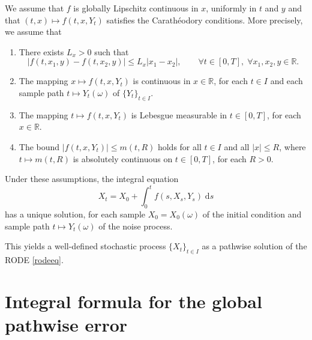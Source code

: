 \documentclass[reqno,12pt]{amsart}
\theoremstyle{plain}%
\theoremstyle{definition}
\begin{document}
We assume that $f$ is globally Lipschitz continuous in $x$, uniformly in $t$ and $y$ and that $(t, x) \mapsto f(t, x, Y_t)$ satisfies the Carath\'eodory conditions. More precisely, we assume that
\begin{enumerate}
    \item There exists $L_x > 0$ such that
    \begin{equation}
        \label{Lxassumptionbasic}
        |f(t, x_1, y) - f(t, x_2, y)| \leq L_x |x_1 - x_2|, \qquad \forall t \in [0, T], \;\forall x_1, x_2, y\in\mathbb{R}.
    \end{equation}
    \item The mapping $x \mapsto f(t, x, Y_t)$ is continuous in $x\in \mathbb{R}$, for each $t\in I$ and each sample path $t\mapsto Y_t(\omega)$ of $\{Y_t\}_{t\in I}$.
    \item The mapping $t \mapsto f(t, x, Y_t)$ is Lebesgue measurable in $t\in [0, T]$, for each $x\in \mathbb{R}$.
    \item The bound $|f(t, x, Y_t)| \leq m(t, R)$ holds for all $t\in I$ and all $|x| \leq R$, where $t\mapsto m(t, R)$ is absolutely continuous on $t\in [0, T]$, for each $R>0$.
\end{enumerate}

Under these assumptions, the integral equation
$$
X_t = X_0 + \int_0^t f(s, X_s, Y_s) \;\mathrm{d}s
$$
has a unique solution, for each sample $X_0 = X_0(\omega)$ of the initial condition and sample path $t\mapsto Y_t(\omega)$ of the noise process.

This yields a well-defined stochastic process $\{X_t\}_{t\in I}$ as a pathwise solution of the RODE \eqref{rodeeq}.

\section{Integral formula for the global pathwise error}
\end{document}
